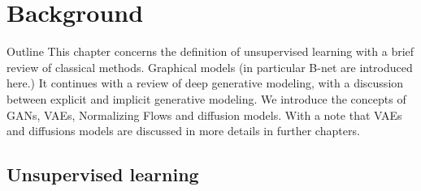\chapter{Background}\label{ch:background}

\begin{remark}{Outline}
This chapter concerns the definition of unsupervised learning with a brief review of classical methods.
Graphical models (in particular B-net are introduced here.)
It continues with a review of deep generative modeling, with a discussion between explicit and implicit generative modeling.
We introduce the concepts of GANs, VAEs, Normalizing Flows and diffusion models. With a note that VAEs and diffusions models
are discussed in more details in further chapters.
\end{remark}

\section{Unsupervised learning}
\label{sec:2:Unsupervised learning}
